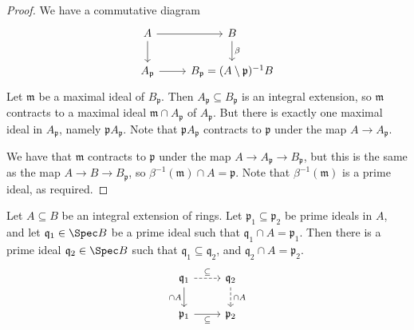 \begin{proof}
    We have a commutative diagram
\[\begin{tikzcd}
	A & B \\
	{A_{\mathfrak p}} & {B_{\mathfrak p} = (A \setminus \mathfrak p)^{-1}B}
	\arrow[from=1-1, to=1-2]
	\arrow["\beta", from=1-2, to=2-2]
	\arrow[from=1-1, to=2-1]
	\arrow[from=2-1, to=2-2]
\end{tikzcd}\]
    Let \( \mathfrak m \) be a maximal ideal of \( B_{\mathfrak p} \).
    Then \( A_{\mathfrak p} \subseteq B_{\mathfrak p} \) is an integral extension, so \( \mathfrak m \) contracts to a maximal ideal \( \mathfrak m \cap A_{\mathfrak p} \) of \( A_{\mathfrak p} \).
    But there is exactly one maximal ideal in \( A_{\mathfrak p} \), namely \( \mathfrak p A_{\mathfrak p} \).
    Note that \( \mathfrak p A_{\mathfrak p} \) contracts to \( \mathfrak p \) under the map \( A \to A_{\mathfrak p} \).

    We have that \( \mathfrak m \) contracts to \( \mathfrak p \) under the map \( A \to A_{\mathfrak p} \to B_{\mathfrak p} \), but this is the same as the map \( A \to B \to B_{\mathfrak p} \), so \( \beta^{-1} (\mathfrak m) \cap A = \mathfrak p \).
    Note that \( \beta^{-1}(\mathfrak m) \) is a prime ideal, as required.
\end{proof}
\begin{theorem}[going up]
    Let \( A \subseteq B \) be an integral extension of rings.
    Let \( \mathfrak p_1 \subseteq \mathfrak p_2 \) be prime ideals in \( A \), and let \( \mathfrak q_1 \in \Spec B \) be a prime ideal such that \( \mathfrak q_1 \cap A = \mathfrak p_1 \).
    Then there is a prime ideal \( \mathfrak q_2 \in \Spec B \) such that \( \mathfrak q_1 \subseteq \mathfrak q_2 \), and \( \mathfrak q_2 \cap A = \mathfrak p_2 \).
\[\begin{tikzcd}
	{\mathfrak q_1} & {\mathfrak q_2} \\
	{\mathfrak p_1} & {\mathfrak p_2}
	\arrow["\subseteq", dashed, from=1-1, to=1-2]
	\arrow["{\cap A}", dashed, from=1-2, to=2-2]
	\arrow["{\cap A}"', from=1-1, to=2-1]
	\arrow["\subseteq"', from=2-1, to=2-2]
\end{tikzcd}\]
\end{theorem}

